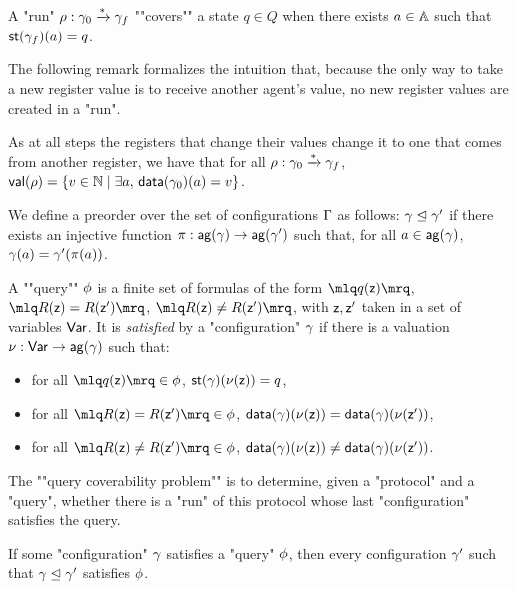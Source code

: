 \begin{definition}
A "run" $\rho: \gamma_0 \xrightarrow{*} \gamma_f$ ""covers"" a state $q \in Q$ when there exists $a \in \mathbb{A}$ such that $\mathsf{st}(\gamma_f)(a) = q$. 

\end{definition}

The following remark formalizes the intuition that, because the only way to take a new register value is to receive another agent's value, no new register values are created in a "run".
\begin{remark}
\label{rem:run_no_new_register_values}
As at all steps the registers that change their values change it to one that comes from another register, we have that for all $\rho: \gamma_0 \xrightarrow{*} \gamma_f$, $\mathsf{val}(\rho) = \{v \in \mathbb{N} \mid \exists a, \, \mathsf{data}(\gamma_0)(a) = v\}$.
\end{remark}

\begin{definition}
We define a preorder over the set of configurations $\Gamma$ as follows: $\gamma \trianglelefteq \gamma'$ if there exists an injective function $\pi: \mathsf{ag}(\gamma) \rightarrow \mathsf{ag}(\gamma')$ such that, for all $a \in \mathsf{ag}(\gamma)$, $\gamma(a) = \gamma'(\pi(a))$. 
\end{definition}

\begin{definition}
	A ""query"" $\phi$ is a finite set of formulas of the form $\quotemarks{q(\var{z})}$, $\quotemarks{R(\var{z}) = R(\var{z}')}$, $\quotemarks{R(\var{z}) \neq R(\var{z}')}$, with $\mathsf{z}, \mathsf{z}'$ taken in a set of variables $\mathsf{Var}$.
	It is \emph{satisfied} by a "configuration" $\gamma$ if there is a valuation $\nu : \mathsf{Var} \to \mathsf{ag}(\gamma)$ such that:
	\begin{itemize}
		\item for all $\quotemarks{q(\var{z})} \in \query$, $\mathsf{st}(\gamma)(\nu(\mathsf{z})) = q$,
		
		\item for all $\quotemarks{R(\var{z}) = R(\var{z'})} \in \query$, $\mathsf{data}(\gamma)(\nu(\mathsf{z})) = \mathsf{data}(\gamma)(\nu(\mathsf{z'}))$,
		
		\item for all $\quotemarks{R(\var{z}) \neq R(\var{z'})} \in \query$, $\mathsf{data}(\gamma)(\nu(\mathsf{z})) \neq \mathsf{data}(\gamma)(\nu(\mathsf{z'}))$.
	\end{itemize}

	\AP The ""query coverability problem"" is to determine, given a "protocol" and a "query", whether there is a "run" of this protocol whose last "configuration" satisfies the query.
\end{definition}

\begin{remark}
\label{rem:bigger_config_query}
If some "configuration" $\gamma$ satisfies a "query" $\phi$, then every configuration $\gamma'$ such that $\gamma \trianglelefteq \gamma'$ satisfies $\phi$. 
\end{remark}

